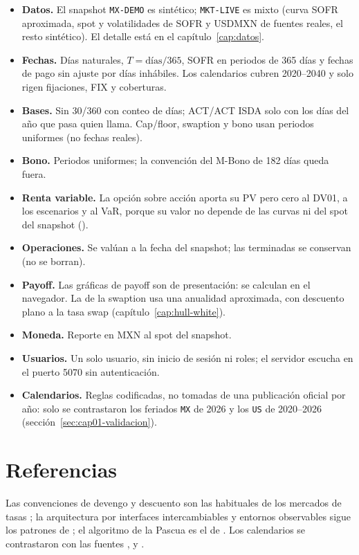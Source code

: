 \begin{sloppypar}
\begin{limites}
  \begin{itemize}
    \item \textbf{Datos.} El snapshot \texttt{MX-DEMO} es sintético; \texttt{MKT-LIVE} es mixto (curva SOFR aproximada, spot y volatilidades de SOFR y USDMXN de fuentes reales, el resto sintético). El detalle está en el capítulo~\ref{cap:datos}.
    \item \textbf{Fechas.} Días naturales, $T=\text{días}/365$, SOFR en periodos de 365 días y fechas de pago sin ajuste por días inhábiles. Los calendarios cubren 2020--2040 y solo rigen fijaciones, FIX y coberturas.
    \item \textbf{Bases.} Sin 30/360 con conteo de días; ACT/ACT ISDA solo con los días del año que pasa quien llama. Cap/floor, swaption y bono usan periodos uniformes (no fechas reales).
    \item \textbf{Bono.} Periodos uniformes; la convención del M-Bono de 182 días queda fuera.
    \item \textbf{Renta variable.} La opción sobre acción aporta su PV pero cero al DV01, a los escenarios y al VaR, porque su valor no depende de las curvas ni del spot del snapshot ().
    \item \textbf{Operaciones.} Se valúan a la fecha del snapshot; las terminadas se conservan (no se borran).
    \item \textbf{Payoff.} Las gráficas de payoff son de presentación: se calculan en el navegador. La de la swaption usa una anualidad aproximada, con descuento plano a la tasa swap (capítulo~\ref{cap:hull-white}).
    \item \textbf{Moneda.} Reporte en MXN al spot del snapshot.
    \item \textbf{Usuarios.} Un solo usuario, sin inicio de sesión ni roles; el servidor escucha en el puerto 5070 sin autenticación.
    \item \textbf{Calendarios.} Reglas codificadas, no tomadas de una publicación oficial por año: solo se contrastaron los feriados \texttt{MX} de 2026 y los \texttt{US} de 2020--2026 (sección~\ref{sec:cap01-validacion}).
  \end{itemize}
\end{limites}

\section{Referencias}\label{sec:cap01-referencias}

Las convenciones de devengo y descuento son las habituales de los mercados de tasas \citep{hull2018}; la
arquitectura por interfaces intercambiables y entornos observables sigue los patrones de \citet{gamma1995}; el
algoritmo de la Pascua es el de \citet{meeus1998}. Los calendarios se contrastaron con las fuentes
\citet{banxico2026c}, \citet{sifma2026} y \citet{frb2026}.
\end{sloppypar}
